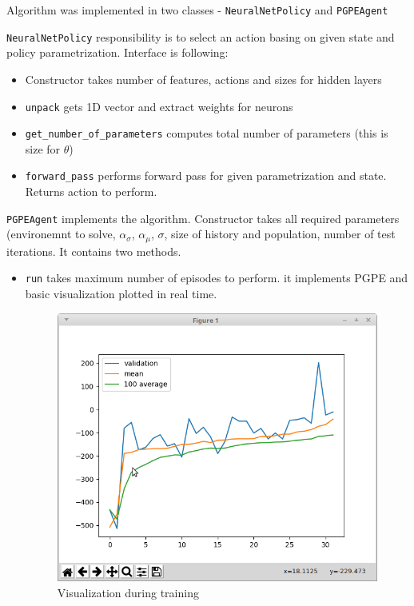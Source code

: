 \documentclass[12pt]{article}
\begin{document}
Algorithm was implemented in two classes - \texttt{NeuralNetPolicy} and \texttt{PGPEAgent}

\texttt{NeuralNetPolicy} responsibility is to select an action basing on given state and policy parametrization. Interface is following:

\begin{itemize}
\item  Constructor takes number of features, actions and sizes for hidden layers

\item \texttt{unpack} gets 1D vector and extract weights for neurons 

\item \texttt{get\_number\_of\_parameters} computes total number of parameters (this is size for $\theta$)

\item \texttt{forward\_pass} performs forward pass for given parametrization and state. Returns action to perform.
\end{itemize}

\texttt{PGPEAgent} implements the algorithm. Constructor takes all required parameters (environemnt to solve, $\alpha_\sigma$, $\alpha_\mu$, $\sigma$, size of history and population, number of test iterations. It contains two methods.

\begin{itemize}

\item \texttt{run} takes maximum number of episodes to perform. it implements PGPE and basic visualization plotted in real time.

\begin{figure}[h]
\centering
\includegraphics[scale=0.5]{monitor.png} 
\caption{Visualization during training}
\end{figure}

\end{itemize}
\end{document}
